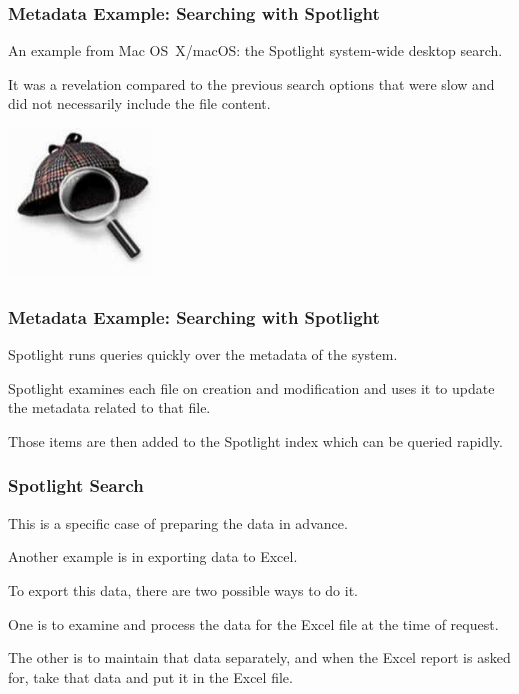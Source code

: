 \begin{frame}
\frametitle{Metadata Example: Searching with Spotlight}

An example from Mac OS~X/macOS: the Spotlight system-wide desktop search. 

It was a revelation compared to the previous search options that were slow and did not necessarily include the file content.

\begin{center}
	\includegraphics[width=0.3\textwidth]{images/sherlock175.jpg}
\end{center}

\end{frame}



\begin{frame}
\frametitle{Metadata Example: Searching with Spotlight}

Spotlight runs queries quickly over the metadata of the system. 

Spotlight examines each file on creation and modification and uses it to update the metadata related to that file. 

Those items are then added to the Spotlight index which can be queried rapidly.

\end{frame}

\begin{frame}
\frametitle{Spotlight Search}

This is a specific case of preparing the data in advance. 

Another example is in exporting data to Excel. 

To export this data, there are two possible ways to do it.

One is to examine and process the data for the Excel file at the time of request. 

The other is to maintain that data separately, and when the Excel report is asked for, take that data and put it in the Excel file.


\end{frame}

